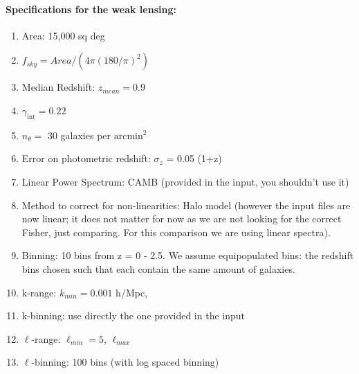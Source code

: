 \paragraph{Specifications for the weak lensing:}
\begin{enumerate}
\item Area: 15,000 sq deg
\item $f_{sky} = Area/(4 \pi (180/\pi)^2)$
\item Median Redshift: $z_{mean} = 0.9$
\item $\gamma_{\mathrm{int}}=0.22$
\item $n_\theta =$ 30 galaxies per $\mathrm{arcmin}^{2}$
\item Error on photometric redshift: $\sigma_z$ = 0.05 (1+z)
\item Linear Power Spectrum: CAMB (provided in the input, you shouldn't use it)
\item Method to correct for non-linearities: Halo model  (however the input files are now linear; it does not matter for now as we are not looking for the correct Fisher, just comparing. For this comparison we are using linear spectra).
\item Binning: 10 bins from z = 0 - 2.5. We assume equipopulated bins: the redshift bins chosen such that each contain
the same amount of galaxies. 
\item k-range: $k_{min}=0.001$ h/Mpc, 
\item k-binning: use directly the one provided in the input
\item $\ell$-range: $\ell_{min}=5$, $\ell_{max}$ 
\item $\ell$-binning: 100 bins (with log spaced binning)
\end{enumerate}

%

